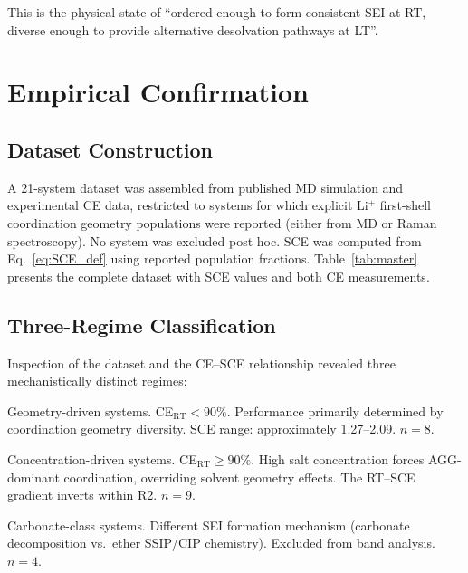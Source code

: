\documentclass[11pt]{article}
\theoremstyle{plain}
\theoremstyle{definition}
\theoremstyle{remark}
\begin{document}
This is the physical state of ``ordered enough to form consistent SEI at RT,
diverse enough to provide alternative desolvation pathways at LT''.

\section{Empirical Confirmation}
\label{sec:empirical}

\subsection{Dataset Construction}

A 21-system dataset was assembled from published MD simulation and experimental
CE data, restricted to systems for which explicit Li$^+$ first-shell coordination
geometry populations were reported (either from MD or Raman spectroscopy).
No system was excluded post hoc.  SCE was computed from Eq.~\eqref{eq:SCE_def}
using reported population fractions.  Table~\ref{tab:master} presents the complete
dataset with SCE values and both CE measurements.

\subsection{Three-Regime Classification}

Inspection of the dataset and the CE--SCE relationship revealed three mechanistically
distinct regimes:

\begin{description}[leftmargin=2em]
  \item[Regime 1 (R1)] Geometry-driven systems.  CE$_{\mathrm{RT}} < 90\%$.
    Performance primarily determined by coordination geometry diversity.
    SCE range: approximately 1.27--2.09.  $n = 8$.

  \item[Regime 2 (R2)] Concentration-driven systems.  CE$_{\mathrm{RT}} \geq 90\%$.
    High salt concentration forces AGG-dominant coordination, overriding
    solvent geometry effects.  The RT--SCE gradient inverts within R2.
    $n = 9$.

  \item[Regime 3 (R3)] Carbonate-class systems.  Different SEI formation
    mechanism (carbonate decomposition vs.\ ether SSIP/CIP chemistry).
    Excluded from band analysis.  $n = 4$.
\end{description}
\end{document}
